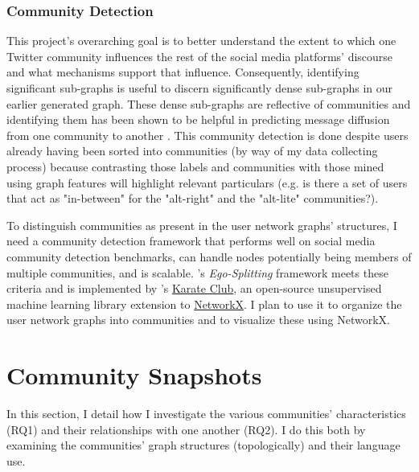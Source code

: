 \documentclass[acmlarge, screen, authorversion]{acmart}
\begin{document}


\subsubsection{Community Detection}

This project's overarching goal is to better understand the extent to which one
Twitter community influences the rest of the social media platforms' discourse
and what mechanisms support that influence. Consequently, identifying significant
sub-graphs is useful to discern significantly dense sub-graphs in our
earlier generated graph. These dense sub-graphs are reflective of communities
and identifying them has been shown to be helpful in predicting message
diffusion from one community to another \cite{wengViralityPredictionCommunity2013}. This community detection
is done despite users already having been sorted into communities (by way of my
data collecting process) because contrasting those labels and communities with
those mined using graph features will highlight relevant particulars (e.g. is
there a set of users that act as "in-between" for the "alt-right" and the
"alt-lite" communities?).

To distinguish communities as present in the user network graphs' structures, I
need a community detection framework that performs well on social media
community detection benchmarks, can handle nodes potentially being members of
multiple communities, and is scalable.
\citet{epastoEgoSplittingFrameworkNonOverlapping2017}'s \textit{Ego-Splitting}
framework meets these criteria and is implemented by
\citet{rozemberczkiAPIOrientedOpensource2020}'s
\href{https://github.com/benedekrozemberczki/karateclub}{Karate Club}, an
open-source unsupervised machine learning library extension to
\href{https://networkx.github.io/}{NetworkX}. I plan to use it to organize the
user network graphs into communities and to visualize these using NetworkX.

\section{Community Snapshots}

In this section, I detail how I investigate the various communities' characteristics (RQ1) and their relationships with one another (RQ2). I do this both by examining the communities' graph structures (topologically) and their language use.
\end{document}
